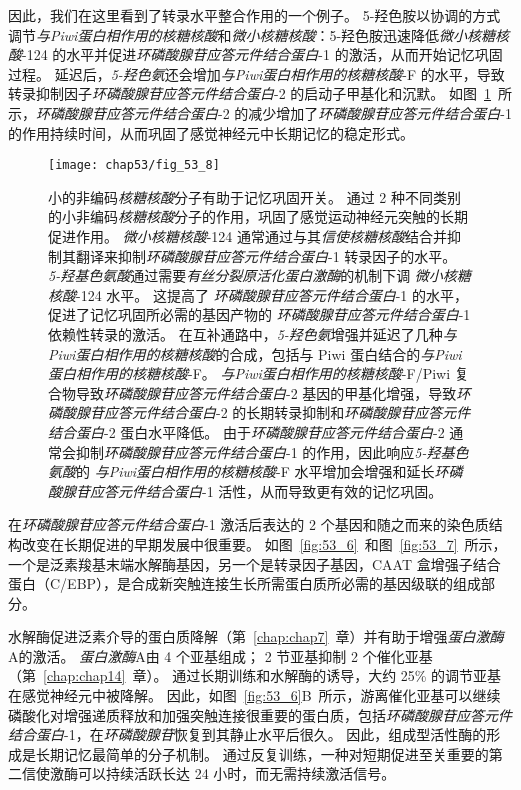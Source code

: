 因此，我们在这里看到了转录水平整合作用的一个例子。
5-羟色胺以协调的方式调节\textit{与Piwi蛋白相作用的核糖核酸}和\textit{微小核糖核酸}：5-羟色胺迅速降低\textit{微小核糖核酸}-124 的水平并促进\textit{环磷酸腺苷应答元件结合蛋白}-1 的激活，从而开始记忆巩固过程。
延迟后，\textit{5-羟色氨}还会增加\textit{与Piwi蛋白相作用的核糖核酸}-F 的水平，导致转录抑制因子\textit{环磷酸腺苷应答元件结合蛋白}-2 的启动子甲基化和沉默。
如图~\ref{fig:53_8}~所示，\textit{环磷酸腺苷应答元件结合蛋白}-2 的减少增加了\textit{环磷酸腺苷应答元件结合蛋白}-1 的作用持续时间，从而巩固了感觉神经元中长期记忆的稳定形式。


\begin{figure}[htbp]
	\centering
	\texttt{[image: chap53/fig\_53\_8]}
	\caption{小的非编码\textit{核糖核酸}分子有助于记忆巩固开关。
		通过 2 种不同类别的小非编码\textit{核糖核酸}分子的作用，巩固了感觉运动神经元突触的长期促进作用。
		\textit{微小核糖核酸}-124 通常通过与其\textit{信使核糖核酸}结合并抑制其翻译来抑制\textit{环磷酸腺苷应答元件结合蛋白}-1 转录因子的水平。
		\textit{5-羟基色氨酸}通过需要\textit{有丝分裂原活化蛋白激酶}的机制下调 \textit{微小核糖核酸}-124 水平。
		这提高了 \textit{环磷酸腺苷应答元件结合蛋白}-1 的水平，促进了记忆巩固所必需的基因产物的 \textit{环磷酸腺苷应答元件结合蛋白}-1 依赖性转录的激活。
		在互补通路中，\textit{5-羟色氨}增强并延迟了几种\textit{与Piwi蛋白相作用的核糖核酸}的合成，包括与 Piwi 蛋白结合的\textit{与Piwi蛋白相作用的核糖核酸}-F。
		\textit{与Piwi蛋白相作用的核糖核酸}-F/Piwi 复合物导致\textit{环磷酸腺苷应答元件结合蛋白}-2 基因的甲基化增强，导致\textit{环磷酸腺苷应答元件结合蛋白}-2 的长期转录抑制和\textit{环磷酸腺苷应答元件结合蛋白}-2 蛋白水平降低。
		由于\textit{环磷酸腺苷应答元件结合蛋白}-2 通常会抑制\textit{环磷酸腺苷应答元件结合蛋白}-1 的作用，因此响应\textit{5-羟基色氨酸}的 \textit{与Piwi蛋白相作用的核糖核酸}-F 水平增加会增强和延长\textit{环磷酸腺苷应答元件结合蛋白}-1 活性，从而导致更有效的记忆巩固。}
	\label{fig:53_8}
\end{figure}


在\textit{环磷酸腺苷应答元件结合蛋白}-1 激活后表达的 2 个基因和随之而来的染色质结构改变在长期促进的早期发展中很重要。
如图~\ref{fig:53_6}~和图~\ref{fig:53_7}~所示，一个是泛素羧基末端水解酶基因，另一个是转录因子基因，CAAT 盒增强子结合蛋白（C/EBP），是合成新突触连接生长所需蛋白质所必需的基因级联的组成部分。


水解酶促进泛素介导的蛋白质降解（第~\ref{chap:chap7}~章）并有助于增强\textit{蛋白激酶}A的激活。
\textit{蛋白激酶}A由 4 个亚基组成；
2 节亚基抑制 2 个催化亚基（第~\ref{chap:chap14}~章）。
通过长期训练和水解酶的诱导，大约 25\% 的调节亚基在感觉神经元中被降解。
因此，如图~\ref{fig:53_6}B~所示，游离催化亚基可以继续磷酸化对增强递质释放和加强突触连接很重要的蛋白质，包括\textit{环磷酸腺苷应答元件结合蛋白}-1，在\textit{环磷酸腺苷}恢复到其静止水平后很久。
因此，组成型活性酶的形成是长期记忆最简单的分子机制。
通过反复训练，一种对短期促进至关重要的第二信使激酶可以持续活跃长达 24 小时，而无需持续激活信号。


